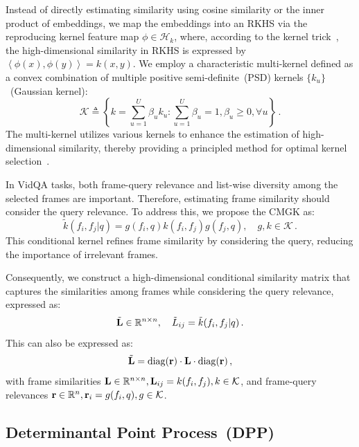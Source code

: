 Instead of directly estimating similarity using cosine similarity or the inner product of embeddings, we map the embeddings into an RKHS via the reproducing kernel feature map \(\phi \in \mathcal{H}_k\), 
where, according to the kernel trick~\cite{scholkopf2005support}, the high-dimensional similarity in RKHS is expressed by \(\left<\phi(x), \phi(y)\right> = k(x, y)\).
%
We employ a characteristic multi-kernel defined as a convex combination of multiple positive semi-definite~(PSD) kernels \(\{k_u\}\)~(\eg Gaussian kernel): 
\begin{equation}\label{eq:k_family}
	\mathcal{K} \triangleq \left\{ 
		k = \sum_{u=1}^{U} \beta_u k_u : \sum_{u=1}^{U} \beta_u = 1, \beta_u \geq 0, \forall u 
	\right\}\,.
\end{equation}
The multi-kernel utilizes various kernels to enhance the estimation of high-dimensional similarity, thereby providing a principled method for optimal kernel selection~\cite{long2015learning,sun2023enhancing}.


In VidQA tasks, both frame-query relevance and list-wise diversity among the selected frames are important. 
Therefore, estimating frame similarity should consider the query relevance.
To address this, we propose the CMGK as:
\begin{equation}\label{eq:cond_k}
    \tilde{k}(f_i, f_j | q) = g(f_i, q)k(f_i, f_j)g(f_j, q),\quad g, k \in \mathcal{K}\,.
\end{equation}
This conditional kernel refines frame similarity by considering the query, reducing the importance of irrelevant frames.


Consequently, we construct a high-dimensional conditional similarity matrix that captures the similarities among frames while considering the query relevance, expressed as:
\begin{equation}\label{eq:tilde_L}
    \tilde{\mathbf{L}} \in \mathbb{R}^{n \times n}, \quad \tilde{L}_{ij} = \tilde{k}(f_i, f_j | q)\,.
\end{equation}
This can also be expressed as:
\begin{equation}\label{eq:cmgk}
    \tilde{\mathbf{L}} = \mathrm{diag}(\mathbf{r})\cdot \mathbf{L} \cdot \mathrm{diag}(\mathbf{r})\,,
\end{equation}
with frame similarities \(\mathbf{L} \in \mathbb{R}^{n \times n}, \mathbf{L}_{ij} = k(f_i, f_j), k \in \mathcal{K}\), and frame-query relevances \(\mathbf{r} \in \mathbb{R}^n, \mathbf{r}_i = g(f_i, q), g \in \mathcal{K}\).


\subsection{Determinantal Point Process~(DPP)}\label{subsec:method_dpp}

